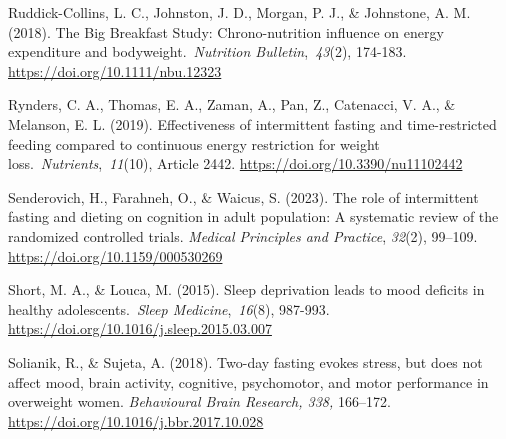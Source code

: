 \documentclass[authordate, empirical,issue]{jote-new-article}
\begin{document}
Ruddick-Collins, L. C., Johnston, J. D., Morgan, P. J., \& Johnstone, A. M. (2018). The Big Breakfast Study: Chrono-nutrition influence on energy expenditure and bodyweight. \emph{Nutrition Bulletin}, \emph{43}(2), 174-183. \url{https://doi.org/10.1111/nbu.12323}



Rynders, C. A., Thomas, E. A., Zaman, A., Pan, Z., Catenacci, V. A., \& Melanson, E. L. (2019). Effectiveness of intermittent fasting and time-restricted feeding compared to continuous energy restriction for weight loss. \emph{Nutrients}, \emph{11}(10), Article 2442. \url{https://doi.org/10.3390/nu11102442}






Senderovich, H., Farahneh, O., \& Waicus, S. (2023). The role of intermittent fasting and dieting on cognition in adult population: A systematic review of the randomized controlled trials. \emph{Medical Principles and Practice}, \emph{32}(2), 99--109. \href{https://doi.org/10.1159/000530269}{https://doi.org/10.1159/000530269}






Short, M. A., \& Louca, M. (2015). Sleep deprivation leads to mood deficits in healthy adolescents. \emph{Sleep Medicine}, \emph{16}(8), 987-993. \url{https://doi.org/10.1016/j.sleep.2015.03.007}



Solianik, R., \& Sujeta, A. (2018). Two-day fasting evokes stress, but does not affect mood, brain activity, cognitive, psychomotor, and motor performance in overweight women. \emph{Behavioural Brain Research, 338,} 166--172. \url{https://doi.org/10.1016/j.bbr.2017.10.028}



\end{document}
